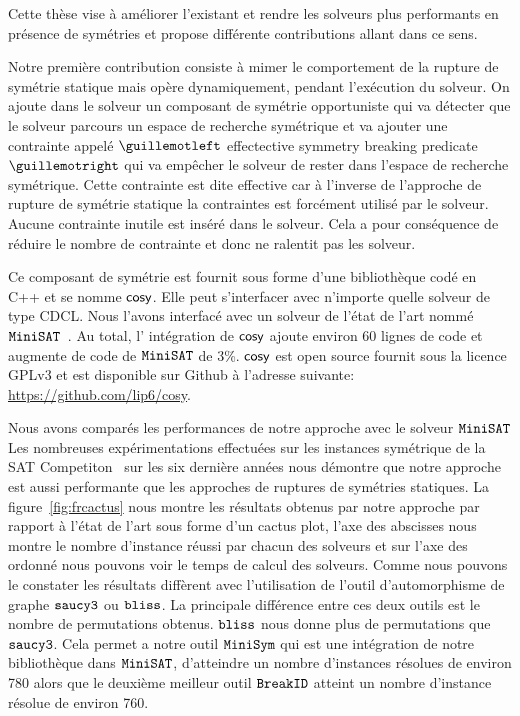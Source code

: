 Cette thèse vise à améliorer l'existant et rendre les solveurs plus performants en présence de symétries et
propose différente contributions allant dans ce sens.  


Notre première contribution consiste à mimer le comportement de la rupture de symétrie statique mais 
opère dynamiquement, pendant l'exécution du solveur. On ajoute dans le solveur un composant de symétrie opportuniste qui va détecter que le solveur parcours un espace de recherche symétrique et va ajouter
une contrainte appelé $\guillemotleft$ effectective symmetry breaking predicate $\guillemotright$ qui va empêcher le solveur de rester dans
l'espace de recherche symétrique. Cette contrainte est dite effective car à l'inverse de l'approche 
de rupture de symétrie  statique la contraintes est forcément utilisé par le solveur. Aucune contrainte
inutile est inséré dans le solveur. Cela a pour conséquence de réduire le nombre de contrainte et donc 
ne ralentit pas les solveur.


Ce composant de symétrie est fournit sous forme d'une bibliothèque codé en C++ et se nomme $\textsf{cosy}$.
Elle peut s'interfacer avec n'importe quelle solveur de type CDCL. 
Nous l'avons interfacé avec un solveur de l'état de l'art nommé $\texttt{MiniSAT}$~\cite{een2003extensible}. Au total, l' intégration de $\textsf{cosy}$ ajoute environ 60 lignes de code 
et augmente de code de $\texttt{MiniSAT}$ de 3\%.
$\textsf{cosy}$ est open source fournit sous la licence GPLv3 et est disponible sur Github à l'adresse suivante: \url{https://github.com/lip6/cosy}.


Nous avons comparés les performances de notre approche avec le solveur $\texttt{MiniSAT}$
Les nombreuses expérimentations effectuées sur les instances symétrique de la SAT Competiton~\cite{jarvisalo2012international} sur les six dernière années nous démontre que notre approche est aussi performante que les approches de ruptures de symétries statiques.
La figure~\ref{fig:frcactus} nous montre les résultats obtenus par notre approche par rapport à l'état de l'art sous forme 
d'un cactus plot, l'axe des abscisses nous montre le nombre d'instance réussi par chacun des solveurs et sur l'axe des ordonné nous pouvons voir
le temps de calcul des solveurs. Comme nous pouvons le constater les résultats diffèrent avec l'utilisation de l'outil d'automorphisme de 
graphe $\texttt{saucy3}$ ou $\texttt{bliss}$. La principale différence entre ces deux outils est le nombre de permutations obtenus. $\texttt{bliss}$ nous donne plus
de permutations que $\texttt{saucy3}$. Cela permet a notre outil $\texttt{MiniSym}$ qui est une intégration de notre bibliothèque dans $\texttt{MiniSAT}$, d'atteindre 
un nombre d'instances résolues de environ 780 alors que le deuxième meilleur outil $\texttt{BreakID}$ atteint un nombre d'instance résolue de environ 760.


